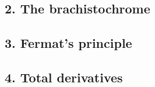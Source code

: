 \documentclass{tufte-book}
\begin{document}
\subsection{2. The brachistochrome}
\subsection{3. Fermat's principle}
\subsection{4. Total derivatives}





	\backmatter

	
	


	\printindex
\end{document}

